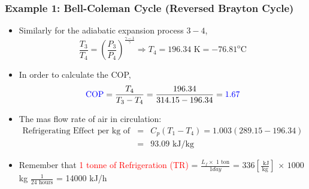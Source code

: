 \documentclass[10pt,compress]{beamer}
\newcommand{\frc}{\displaystyle\frac}
\begin{document}
\begin{frame}
 \frametitle{Example 1: Bell-Coleman Cycle (Reversed Brayton Cycle)}
  \begin{itemize}
   \item <1-> Similarly for the adiabatic expansion process $3-4$, 
    \begin{displaymath}
     \frc{T_{3}}{T_{4}}=\left(\frc{P_{3}}{P_{4}}\right)^{\frc{\gamma-1}{\gamma}} \Rightarrow T_{4}=196.34\text{ K} = -76.81^{\text{o}}\text{C}
    \end{displaymath}

   \item <2-> In order to calculate the COP, 
    \begin{displaymath}
     \textcolor{blue}{\text{COP}} = \frc{T_{4}}{T_{3}-T_{4}} = \frc{196.34}{314.15-196.34} = \textcolor{blue}{1.67}
    \end{displaymath}

   \item <3-> The mas flow rate of air in circulation:
    \begin{eqnarray}
     \text{Refrigerating Effect per kg of air} &=& C_{p}\left(T_{1}-T_{4}\right) = 1.003\left(289.15-196.34\right) \nonumber \\
                                       &=& 93.09\text{ kJ/kg} \nonumber  
    \end{eqnarray}

    \item <4-> Remember that \textcolor{red}{1 tonne of Refrigeration (TR)} = $\frc{L_{f} \times \text{ 1 ton}}{ 1 day }$ = 336$\left[\frc{\text{ kJ}}{\text{kg}}\right]$ $\times$ $1000$ kg $\frc{1}{24\text{ hours}}$ = 14000 kJ/h
  \end{itemize}

\end{frame}
\end{document}
